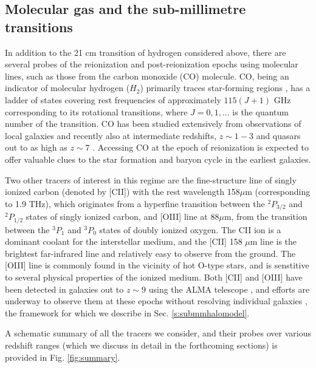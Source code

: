 \subsection{Molecular gas and the sub-millimetre transitions}
\label{sec:submmintro}
In addition to the 21 cm transition of hydrogen considered above, there are several probes of the reionization and post-reionization epochs using molecular lines, such as those from the carbon monoxide (CO) molecule. CO, being an indicator of molecular hydrogen ($H_2$)  primarily traces star-forming regions \cite{breysse2014, mashian2015}, has a ladder of states covering rest frequencies of approximately $115 (J+1)$ GHz corresponding to its rotational transitions, where $J = 0, 1, ...$ is the quantum number of the transition. CO has been studied extensively from observations of local galaxies and recently also at intermediate redshifts, $z \sim 1-3$ \cite{keating2016, walter2016} and quasars out to as high as $z \sim 7$ \cite{venemans2017}. Accessing CO at the epoch of reionization is expected to offer valuable clues to the star formation and baryon cycle in the earliest galaxies. 

Two other tracers of interest in this regime are the  fine-structure line of singly ionized carbon (denoted by [CII]) with the rest wavelength 158$\mu$m (corresponding to 1.9 THz), which originates from a hyperfine transition between the $^{2}P_{3/2}$ and $^{2}P_{1/2}$
states of singly ionized carbon, and [OIII] line at $88 \mu$m, from the transition between the $^{3}P_{1}$ and $^{3}P_{0}$ states of doubly ionized oxygen.  The CII ion is a dominant coolant for the
interstellar medium, and the [CII] 158 $\mu$m line is the brightest far-infrared line and relatively easy to observe from the ground. The [OIII] line is commonly found in the vicinity of hot O-type stars,  and is senstitive to several physical properties of the ionized medium.  Both [CII] and [OIII] have been detected in galaxies out to $z \sim 9$ using the ALMA telescope \cite{pentericci2016, smit2018, laporte2017, harikane2020, tamura2019, hashimoto2018c, laporte2019, carniani2017}, and efforts are underway to observe them at these epochs without resolving individual galaxies \cite{terry2019, lagache2018, exclaimpaper2020}, the framework for which we describe in Sec. \ref{s:submmhalomodel}.


A schematic summary of all the tracers we consider, and their probes over various redshift ranges (which we discuss in detail in the forthcoming sections) is provided in Fig. \ref{fig:summary}.

